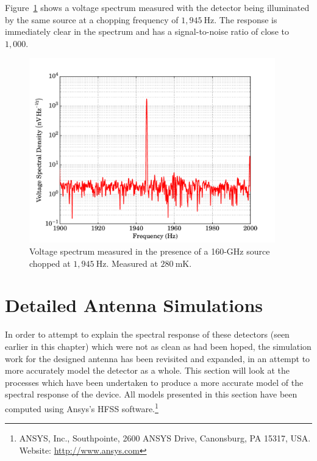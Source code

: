 \par 
Figure~\ref{fig:strainedChopped_freq} shows a voltage spectrum measured with the detector being illuminated by the same source at a chopping frequency of $1,945~\mathrm{Hz}$. The response is immediately clear in the spectrum and has a signal-to-noise ratio of close to $1,000$.
\begin{figure}[tb]
\begin{center}
\includegraphics[width = 0.95\textwidth]{figures/strained_chopped}
\caption[Voltage spectrum measured in the presence of a 160-GHz source chopped at $1,945~\mathrm{Hz}$]{Voltage spectrum measured in the presence of a 160-GHz source chopped at $1,945~\mathrm{Hz}$. Measured at $280~\mathrm{mK}$.}
\label{fig:strainedChopped_freq}
\end{center}
\end{figure}
%
\section{Detailed Antenna Simulations}\label{sec:antennaSims}
In order to attempt to explain the spectral response of these detectors (seen earlier in this chapter) which were not as clean as had been hoped, the simulation work for the designed antenna has been revisited and expanded, in an attempt to more accurately model the detector as a whole. This section will look at the processes which have been undertaken to produce a more accurate model of the spectral response of the device. All models presented in this section have been computed using Ansys's HFSS software.\footnote{ANSYS, Inc., Southpointe, 2600 ANSYS Drive, Canonsburg, PA 15317, USA. Website: \url{http://www.ansys.com}}
%
